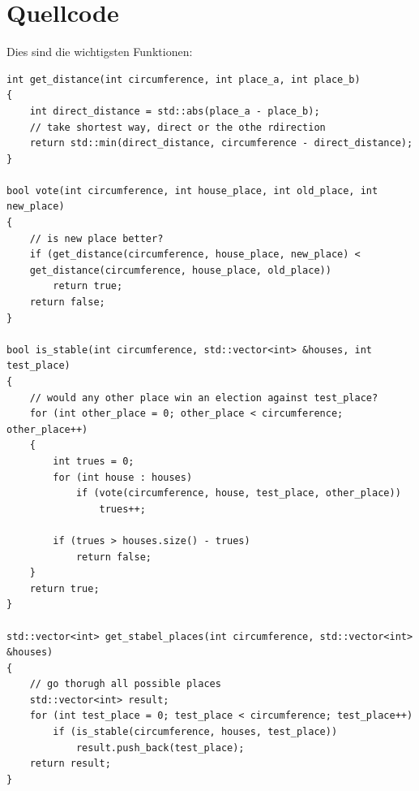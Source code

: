 \documentclass[a4paper,10pt,ngerman]{scrartcl}
\begin{document}
\section{Quellcode}
Dies sind die wichtigsten Funktionen:
\begin{lstlisting}
int get_distance(int circumference, int place_a, int place_b)
{
    int direct_distance = std::abs(place_a - place_b);
    // take shortest way, direct or the othe rdirection
    return std::min(direct_distance, circumference - direct_distance);
}

bool vote(int circumference, int house_place, int old_place, int new_place)
{
    // is new place better?
    if (get_distance(circumference, house_place, new_place) <
    get_distance(circumference, house_place, old_place))
        return true;
    return false;
}

bool is_stable(int circumference, std::vector<int> &houses, int test_place)
{
    // would any other place win an election against test_place?
    for (int other_place = 0; other_place < circumference; other_place++)
    {
        int trues = 0;
        for (int house : houses)
            if (vote(circumference, house, test_place, other_place))
                trues++;

        if (trues > houses.size() - trues)
            return false;
    }
    return true;
}

std::vector<int> get_stabel_places(int circumference, std::vector<int> &houses)
{
    // go thorugh all possible places
    std::vector<int> result;
    for (int test_place = 0; test_place < circumference; test_place++)
        if (is_stable(circumference, houses, test_place))
            result.push_back(test_place);
    return result;
}
\end{lstlisting}
\end{document}
